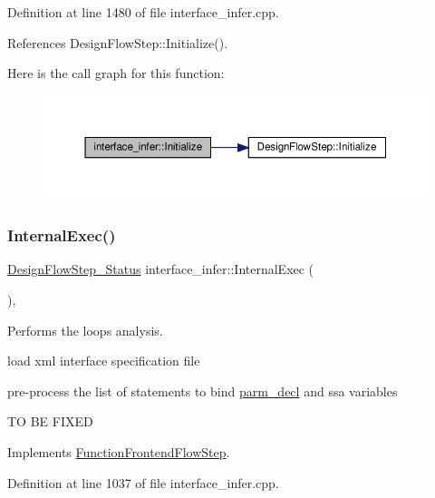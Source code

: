 Definition at line 1480 of file interface\+\_\+infer.\+cpp.



References Design\+Flow\+Step\+::\+Initialize().

Here is the call graph for this function\+:
\nopagebreak
\begin{figure}[H]
\begin{center}
\leavevmode
\includegraphics[width=350pt]{d9/d8a/classinterface__infer_a6d0b5cf326bca201100be4cb19f1a588_cgraph}
\end{center}
\end{figure}
\mbox{\label{classinterface__infer_ac613f0dc15f8116799a922fc7fbd726a}} 
\subsubsection{\texorpdfstring{Internal\+Exec()}{InternalExec()}}
{\footnotesize\ttfamily \hyperlink{design__flow__step_8hpp_afb1f0d73069c26076b8d31dbc8ebecdf}{Design\+Flow\+Step\+\_\+\+Status} interface\+\_\+infer\+::\+Internal\+Exec (\begin{DoxyParamCaption}{ }\end{DoxyParamCaption})\hspace{0.3cm}{\ttfamily [override]}, {\ttfamily [virtual]}}



Performs the loops analysis. 

load xml interface specification file

pre-\/process the list of statements to bind \hyperlink{structparm__decl}{parm\+\_\+decl} and ssa variables

TO BE F\+I\+X\+ED 

Implements \hyperlink{classFunctionFrontendFlowStep_a00612f7fb9eabbbc8ee7e39d34e5ac68}{Function\+Frontend\+Flow\+Step}.



Definition at line 1037 of file interface\+\_\+infer.\+cpp.



